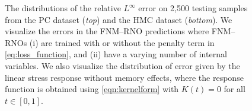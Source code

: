 \documentclass[letterpaper,11pt]{article}
\begin{document}
\begin{figure}[htb]
    \centering
    \caption{The distributions of the relative $L^{\infty}$ error on 2,500 testing samples from the PC dataset (\textit{top}) and the HMC dataset (\textit{bottom}). We visualize the errors in the FNM--RNO predictions where FNM--RNOs (i) are trained with or without the penalty term in \eqref{eq:loss_function}, and (ii) have a varying number of internal variables. We also visualize the distribution of error given by the linear stress response without memory effects, where the response function is obtained using \eqref{eqn:kernelform} with $K(t)=0$ for all $t\in[0,1]$.}
    \label{fig:l_infity_error_distribution}
\end{figure}
\newpage
\end{document}
